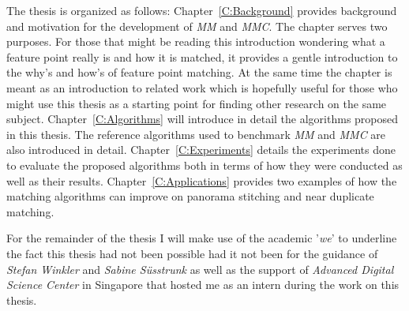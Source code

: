 The thesis is organized as follows: Chapter~\ref{C:Background} provides 
background and motivation for the development of \emph{MM} and 
\emph{MMC}. The chapter serves two purposes.  For those that might be 
reading this introduction wondering what a feature point really is and 
how it is matched, it provides a gentle introduction to the why's and 
how's of feature point matching. At the same time the chapter is meant 
as an introduction to related work which is hopefully useful for those 
who might use this thesis as a starting point for finding other research 
on the same subject. Chapter~\ref{C:Algorithms} will introduce in detail 
the algorithms proposed in this thesis. The reference algorithms used to 
benchmark \emph{MM} and \emph{MMC} are also introduced in detail.  
Chapter~\ref{C:Experiments} details the experiments done to evaluate the 
proposed algorithms both in terms of how they were conducted as well as 
their results. Chapter~\ref{C:Applications} provides two examples of how 
the matching algorithms can improve on panorama stitching and near 
duplicate matching.

For the remainder of the thesis I will make use of the academic 
'\emph{we}' to underline the fact this thesis had not been possible had 
it not been for the guidance of \emph{Stefan Winkler} and \emph{Sabine 
S\"usstrunk} as well as the support of \emph{Advanced Digital Science 
Center} in Singapore that hosted me as an intern during the work on this 
thesis. 
